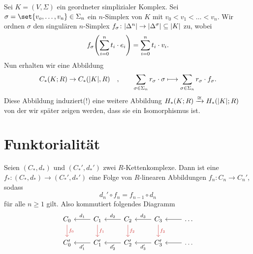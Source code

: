 \begin{bemerkung}[{name=[{Vorgehen, um später zu zeigen: $H_*(K;R) \cong H_*(\abs*{K};R)$}]}]
	Sei $K=(V,\Sigma)$ ein geordneter simplizialer Komplex. 
	Sei $\sigma= \set{v_o, \ldots , v_n} \in \Sigma_n $ ein $n$-Simplex von $K$ mit $v_0 < v_1 < \ldots < v_n$. 
	Wir ordnen $\sigma$ den singulären $n$-Simplex $f_\sigma \colon \abs*{\Delta^n} \to \abs*{\Delta^\sigma} \subseteq \abs*{K}$ zu, wobei
	\begin{align*}
		f_\sigma \enbrace*{\sum_{i=0}^{n} t_i \cdot e_i} = \sum_{i=0}^{n} t_i \cdot v_i. 
	\end{align*}
	Nun erhalten wir eine Abbildung 
	\[
		C_*(K;R) \to C_*(\abs*{K},R) \quad , \qquad   \sum_{\sigma \in \Sigma_n} r_\sigma \cdot \sigma \longmapsto \sum_{\sigma \in \Sigma_n} r_\sigma \cdot f_\sigma.
	\]
	Diese Abbildung induziert(!) eine weitere Abbildung $H_*(K;R) \xrightarrow{\cong} H_*(\abs*{K};R )$ von der wir später zeigen werden, dass sie ein Isomorphismus ist.
\end{bemerkung}

\newpage

\section{Funktorialität} %
\label{sec:6}

\begin{definition}[{name=[{$R$-Kettenabbildung}]},label=def:61]
	Seien $(C_*,d_*)$ und $(C_*',d_*')$ zwei $R$-Kettenkomplexe. 
	Dann ist eine  $f_* \colon (C_*,d_*) \to (C_*',d_*')$ eine Folge von $R$-linearen Abbildungen $f_n \colon C_n \to C_n'$, sodass
	\[
		d_n' \circ f_n = f_{n-1} \circ d_n
	\]
	für alle $n\ge 1$ gilt. Also kommutiert folgendes Diagramm
	\[
		\begin{tikzcd}[sep=normal]
			C_0 \dar["f_0", Firebrick3] & C_1 \lar["d_1"'] \dar["f_1", Firebrick3] & C_2 \lar["d_2"'] \dar["f_2", Firebrick3]& C_3 \lar["d_3"'] \dar["f_3", Firebrick3]& \ldots \lar \\
			C_0' & C_1' \lar["d_1'"]  & C_2' \lar["d_2'"]& C_3' \lar["d_3'"]& \ldots \lar
		\end{tikzcd}
	\]
\end{definition}

